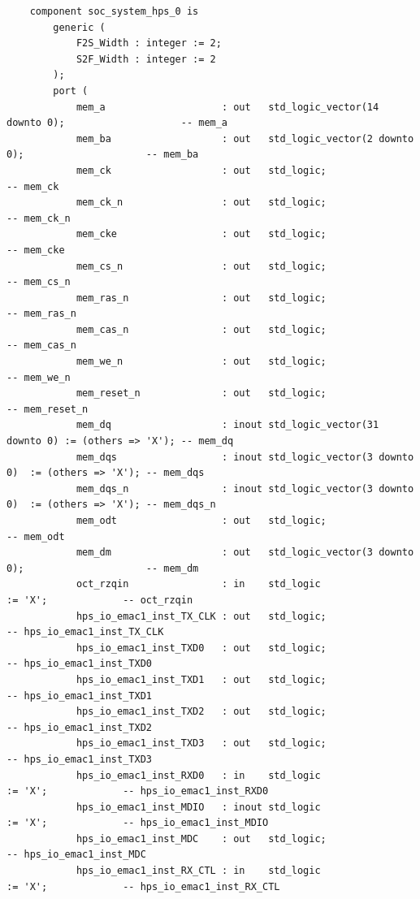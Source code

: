 \documentclass[conference]{IEEEtran}
\begin{document}
\begin{lstlisting}
	component soc_system_hps_0 is
		generic (
			F2S_Width : integer := 2;
			S2F_Width : integer := 2
		);
		port (
			mem_a                    : out   std_logic_vector(14 downto 0);                    -- mem_a
			mem_ba                   : out   std_logic_vector(2 downto 0);                     -- mem_ba
			mem_ck                   : out   std_logic;                                        -- mem_ck
			mem_ck_n                 : out   std_logic;                                        -- mem_ck_n
			mem_cke                  : out   std_logic;                                        -- mem_cke
			mem_cs_n                 : out   std_logic;                                        -- mem_cs_n
			mem_ras_n                : out   std_logic;                                        -- mem_ras_n
			mem_cas_n                : out   std_logic;                                        -- mem_cas_n
			mem_we_n                 : out   std_logic;                                        -- mem_we_n
			mem_reset_n              : out   std_logic;                                        -- mem_reset_n
			mem_dq                   : inout std_logic_vector(31 downto 0) := (others => 'X'); -- mem_dq
			mem_dqs                  : inout std_logic_vector(3 downto 0)  := (others => 'X'); -- mem_dqs
			mem_dqs_n                : inout std_logic_vector(3 downto 0)  := (others => 'X'); -- mem_dqs_n
			mem_odt                  : out   std_logic;                                        -- mem_odt
			mem_dm                   : out   std_logic_vector(3 downto 0);                     -- mem_dm
			oct_rzqin                : in    std_logic                     := 'X';             -- oct_rzqin
			hps_io_emac1_inst_TX_CLK : out   std_logic;                                        -- hps_io_emac1_inst_TX_CLK
			hps_io_emac1_inst_TXD0   : out   std_logic;                                        -- hps_io_emac1_inst_TXD0
			hps_io_emac1_inst_TXD1   : out   std_logic;                                        -- hps_io_emac1_inst_TXD1
			hps_io_emac1_inst_TXD2   : out   std_logic;                                        -- hps_io_emac1_inst_TXD2
			hps_io_emac1_inst_TXD3   : out   std_logic;                                        -- hps_io_emac1_inst_TXD3
			hps_io_emac1_inst_RXD0   : in    std_logic                     := 'X';             -- hps_io_emac1_inst_RXD0
			hps_io_emac1_inst_MDIO   : inout std_logic                     := 'X';             -- hps_io_emac1_inst_MDIO
			hps_io_emac1_inst_MDC    : out   std_logic;                                        -- hps_io_emac1_inst_MDC
			hps_io_emac1_inst_RX_CTL : in    std_logic                     := 'X';             -- hps_io_emac1_inst_RX_CTL

\end{lstlisting}
\end{document}
